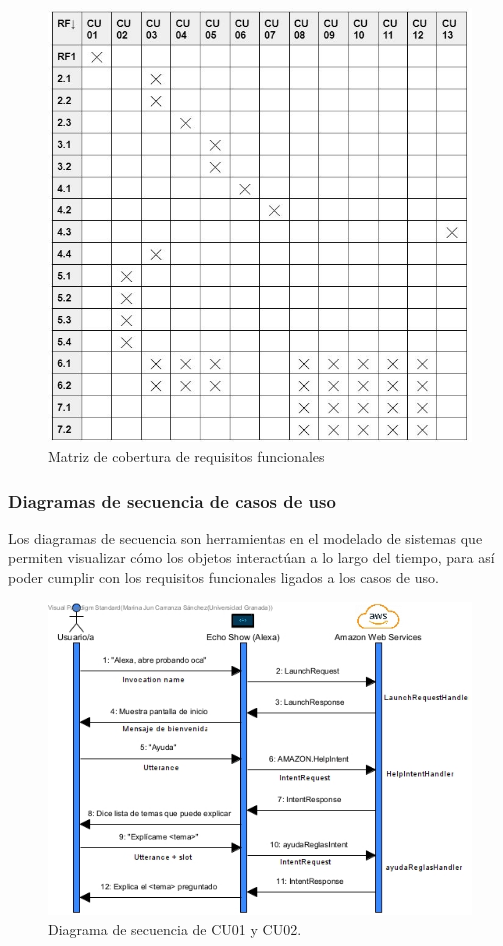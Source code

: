 \begin{figure}[H]
	\centering
	\includegraphics{imgs/matriz-requisitos.JPG}
	\caption{Matriz de cobertura de requisitos funcionales}
	\label{fig:matriz-requisitos}
\end{figure}

\newpage
\subsubsection{Diagramas de secuencia de casos de uso}

Los diagramas de secuencia son herramientas en el modelado de sistemas que permiten visualizar cómo los objetos interactúan a lo largo del tiempo, para así poder cumplir con los requisitos funcionales ligados a los casos de uso.

\begin{figure}[H]
	\centering
	\includegraphics[width=1\textwidth]{imgs/DS01.jpg}
	\caption{Diagrama de secuencia de CU01 y CU02.}
	\label{fig:DS01}
\end{figure}

